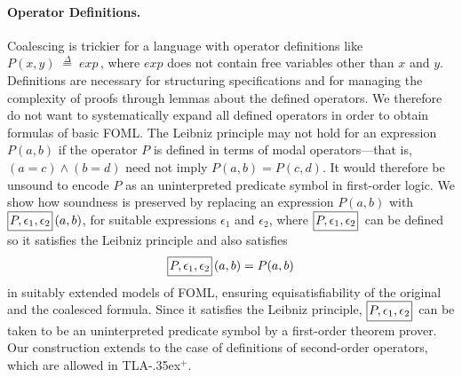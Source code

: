 \documentclass{easychair}
\makeatletter
\newcommand{\eps}{\epsilon}
\renewcommand{\implies}{\Rightarrow}
\newcommand{\tlaplus}{\mbox{TLA\kern -.35ex$^+$}\xspace}
\newcommand{\B}[1]{\framebox{\rule{0pt}{.6em}\ensuremath{\!\tlachars #1\!}}\,}
\newcommand{\edmargin}[2]{\marginpar{\raggedright\footnotesize\color{red}#1: #2}}
\newcommand{\edmargin}[2]{}
\def\llmargin{\edmargin{LL}}
\def\smmargin{\edmargin{SM}}
\def\jkmargin{\edmargin{JK}}
\let\tlachars\relax
\newcommand{\deq}{\mathrel{\stackrel{\scriptscriptstyle\Delta}{=}}}
\def\A{\forall\,}
\newenvironment{noj}{\begin{array}[t]{@{}l@{}}}{\end{array}}
\makeatother
\begin{document}
\paragraph{Operator Definitions.}

Coalescing is trickier for a language with
operator definitions like
%
  \,\,$P(x,y) \;\deq\; exp$\,,
%
where $exp$ does not contain free variables other than $x$ and $y$.
Definitions are necessary for structuring specifications and for
managing the complexity of proofs through lemmas about the defined
operators.  We therefore do not want to systematically expand all
defined operators in order to obtain formulas of basic FOML. The
Leibniz principle may not hold for an expression $P(a, b)$ if the
operator $P$ is defined in terms of modal operators---that is,
$(a=c) \land (b=d)$ need not imply
  $P(a,b)=P(c,d)$.  It would
therefore be unsound to encode $P$ as an uninterpreted predicate
symbol in first-order logic.  We show how soundness is preserved
by replacing an expression $P(a,b)$ with $\B{P,\eps_1,\eps_2}(a,b)$,
for suitable expressions $\eps_1$ and $\eps_2$,
where $\B{P,\eps_1,\eps_2}$ can be defined so it
satisfies the Leibniz
principle and also satisfies%
 \[
  \B{P,\eps_1,\eps_2}(a,b) = P(a,b)
 \]
in suitably extended models of FOML, ensuring equisatisfiability of the original
and the coalesced formula.
Since it satisfies the Leibniz principle,
$\B{P,\eps_1,\eps_2}$ can be taken to be an uninterpreted
predicate symbol by a first-order theorem prover.
Our construction extends to the
case of definitions of second-order operators, which are allowed in \tlaplus.
\end{document}
